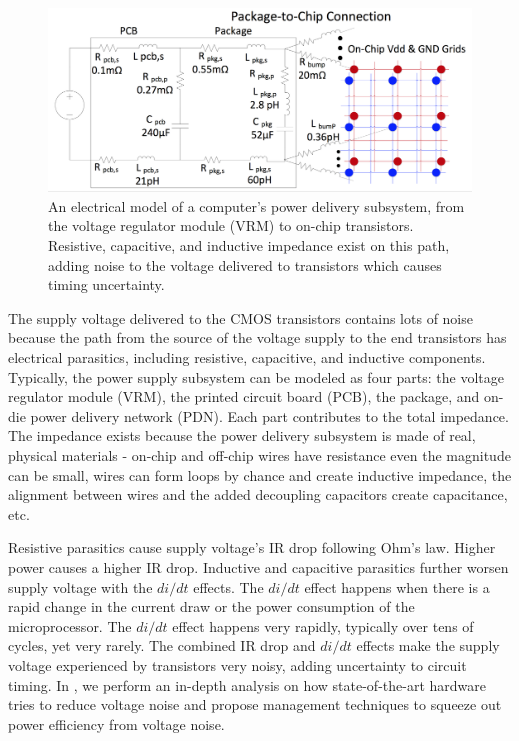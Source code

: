 \begin{figure}[t!]
  \centering
  \includegraphics[trim=0 0 0 0,clip,width=0.8\linewidth]{graphs/background/pdn-model.png}
  \caption{An electrical model of a computer's power delivery subsystem, from the voltage regulator module (VRM) to on-chip transistors. Resistive, capacitive, and inductive impedance exist on this path, adding noise to the voltage delivered to transistors which causes timing uncertainty.}
  \label{fig:pdn-model}
\end{figure}

The supply voltage delivered to the CMOS transistors contains lots of noise because the path from the source of the voltage supply to the end transistors has electrical parasitics, including resistive, capacitive, and inductive components. Typically, the power supply subsystem can be modeled as four parts: the voltage regulator module (VRM), the printed circuit board (PCB), the package, and on-die power delivery network (PDN). Each part contributes to the total impedance. The impedance exists because the power delivery subsystem is made of real, physical materials - on-chip and off-chip wires have resistance even the magnitude can be small, wires can form loops by chance and create inductive impedance, the alignment between wires and the added decoupling capacitors create capacitance, etc.

Resistive parasitics cause supply voltage's IR drop following Ohm's law. Higher power causes a higher IR drop. Inductive and capacitive parasitics further worsen supply voltage with the $di/dt$ effects. The $di/dt$ effect happens when there is a rapid change in the current draw or the power consumption of the microprocessor. The $di/dt$ effect happens very rapidly, typically over tens of cycles, yet very rarely. The combined IR drop and $di/dt$ effects make the supply voltage experienced by transistors very noisy, adding uncertainty to circuit timing. In , we perform an in-depth analysis on how state-of-the-art hardware tries to reduce voltage noise and propose management techniques to squeeze out power efficiency from voltage noise.

